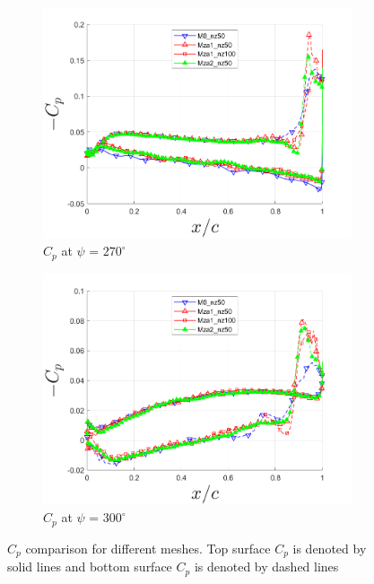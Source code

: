 \begin{figure}[H]
\begin{subfigure}[b]{0.475\textwidth}
		\includegraphics[width=1\textwidth]{figures/zonal_adapt_results/Cp_Re200k/Cp_ph_270.png}
		\caption{ $C_p$ at $\psi$ = $270^\circ$}
		\label{fig:zonal_Cp_Re200k_270}
	\end{subfigure}
	\begin{subfigure}[b]{0.475\textwidth}
		\centering
		\includegraphics[width=1\textwidth]{figures/zonal_adapt_results/Cp_Re200k/Cp_ph_300.png}
		\caption{ $C_p$ at $\psi$ = $300^\circ$}
		\label{fig:zonal_Cp_Re200k_300}
	\end{subfigure}
	\caption{$C_p$ comparison for different meshes. Top surface $C_p$ is denoted by solid lines and bottom surface $C_p$ is denoted by dashed lines}
	\label{fig:zonal_Cp_Re200k_plots}
\end{figure}

